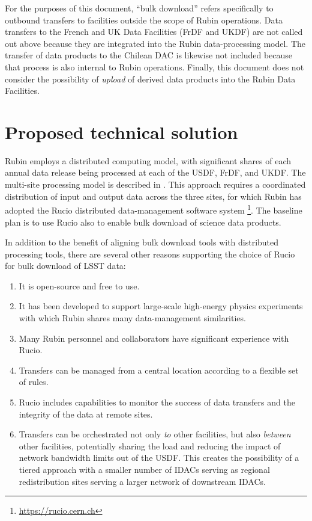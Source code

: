 For the purposes of this document, ``bulk download'' refers specifically to outbound transfers to facilities outside the scope of Rubin operations. Data transfers to the French and UK Data Facilities (FrDF and UKDF) are not called out above because they are integrated into the Rubin data-processing model. The transfer of data products to the Chilean DAC is likewise not included because that process is also internal to Rubin operations. Finally, this document does not consider the possibility of \textit{upload} of derived data products into the Rubin Data Facilities.

\section{Proposed technical solution}

Rubin employs a distributed computing model, with significant shares of each annual data release being processed at each of the USDF, FrDF, and UKDF. The multi-site processing model is described in . This approach requires a coordinated distribution of input and output data across the three sites, for which Rubin has adopted the Rucio distributed data-management software system \citep{2019CSBS....3...11B} \footnote{\url{https://rucio.cern.ch}}. The baseline plan is to use Rucio also to enable bulk download of science data products.

In addition to the benefit of aligning bulk download tools with distributed processing tools, there are several other reasons supporting the choice of Rucio for bulk download of LSST data:
\begin{enumerate}
\item It is open-source and free to use.
\item It has been developed to support large-scale high-energy physics experiments with which Rubin shares many data-management similarities.
\item Many Rubin personnel and collaborators have significant experience with Rucio. 
\item Transfers can be managed from a central location according to a flexible set of rules.
\item Rucio includes capabilities to monitor the success of data transfers and the integrity of the data at remote sites.
\item Transfers can be orchestrated not only \textit{to} other facilities, but also \textit{between} other facilities, potentially sharing the load and reducing the impact of network bandwidth limits out of the USDF. This creates the possibility of a tiered approach with a smaller number of IDACs serving as regional redistribution sites serving a larger network of downstream IDACs.
\end{enumerate}

